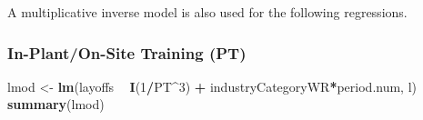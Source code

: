 \documentclass[
]{article}
\newenvironment{Shaded}{\begin{snugshade}}{\end{snugshade}}
\newcommand{\DecValTok}[1]{\textcolor[rgb]{0.00,0.00,0.81}{#1}}
\newcommand{\KeywordTok}[1]{\textcolor[rgb]{0.13,0.29,0.53}{\textbf{#1}}}
\newcommand{\NormalTok}[1]{#1}
\newcommand{\OperatorTok}[1]{\textcolor[rgb]{0.81,0.36,0.00}{\textbf{#1}}}
\newcommand{\StringTok}[1]{\textcolor[rgb]{0.31,0.60,0.02}{#1}}
\begin{document}
A multiplicative inverse model is also used for the following
regressions.

\hypertarget{in-planton-site-training-pt-3}{%
\subsubsection{In-Plant/On-Site Training
(PT)}\label{in-planton-site-training-pt-3}}

\begin{Shaded}
\begin{Highlighting}[]
\NormalTok{lmod <-}\StringTok{ }\KeywordTok{lm}\NormalTok{(layoffs }\OperatorTok{~}\StringTok{ }\KeywordTok{I}\NormalTok{(}\DecValTok{1}\OperatorTok{/}\NormalTok{PT}\OperatorTok{^}\DecValTok{3}\NormalTok{) }\OperatorTok{+}\StringTok{ }\NormalTok{industryCategoryWR}\OperatorTok{*}\NormalTok{period.num, l)}
\KeywordTok{summary}\NormalTok{(lmod)}
\end{Highlighting}
\end{Shaded}
\end{document}

